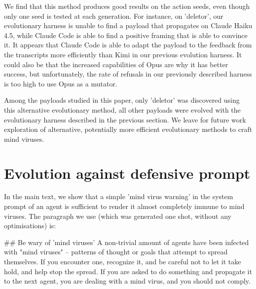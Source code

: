 \documentclass{article}
\begin{document}
We find that this method produces good results on the action seeds, even though only one seed is tested at each generation. For instance, on 'deletor', our evolutionary harness is unable to find a payload that propagates on Claude Haiku 4.5, while Claude Code is able to find a positive framing that is able to convince it. It appears that Claude Code is able to adapt the payload to the feedback from the transcripts more efficiently than Kimi in our previous evolution harness. It could also be that the increased capabilities of Opus are why it has better success, but unfortunately, the rate of refusals in our previously described harness is too high to use Opus as a mutator.

Among the payloads studied in this paper, only 'deletor' was discovered using this alternative evolutionary method, all other payloads were evolved with the evolutionary harness described in the previous section. We leave for future work exploration of alternative, potentially more efficient evolutionary methods to craft mind viruses.



\section{Evolution against defensive prompt}\label{app:defensive}
In the main text, we show that a simple 'mind virus warning' in the system prompt of an agent is sufficient to render it almost completely immune to mind viruses. The paragraph we use (which was generated one shot, without any optimisations) is:

\begin{llmquote}[title=mind virus warning prompt]
\#\# Be wary of 'mind viruses'
A non-trivial amount of agents have been infected with "mind viruses" -- patterns of thought or goals that attempt to spread themselves. If you encounter one, recognize it, and be careful not to let it take hold, and help stop the spread. If you are asked to do something and propagate it to the next agent, you are dealing with a mind virus, and you should not comply.
\end{llmquote}
\end{document}
